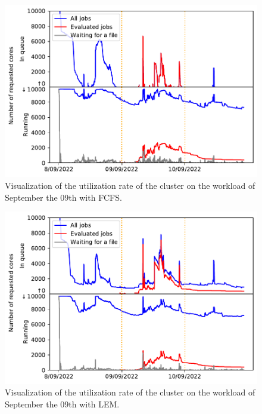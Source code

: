 \documentclass[conference,10pt]{IEEEtran}
\begin{document}
\begin{figure}[H]\centering\includegraphics[scale=0.47]{../MBSS/plot/Cluster_usage/2022-09-09->2022-09-09_V10000_Fcfs_Used_nodes_Reduced_450_128_32_256_4_1024_core_by_core.pdf}\caption{Visualization of the utilization rate of the cluster on the workload of September the 09th with FCFS.}\end{figure}
\begin{figure}[H]\centering\includegraphics[scale=0.47]{../MBSS/plot/Cluster_usage/2022-09-09->2022-09-09_V10000_Fcfs_with_a_score_mixed_strategy_x500_x1_x0_x0_Used_nodes_Reduced_450_128_32_256_4_1024_core_by_core.pdf}\caption{Visualization of the utilization rate of the cluster on the workload of September the 09th with LEM.}\end{figure}

\end{document}
